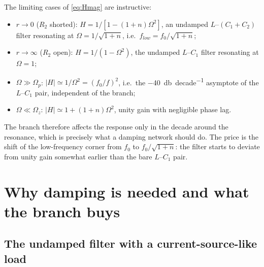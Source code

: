 \documentclass[11pt,a4paper]{article}
\begin{document}
The limiting cases of \eqref{eq:Hmag} are instructive:
\begin{itemize}[nosep]
\item $r \to 0$ ($R_2$ shorted): $H = 1/[1 - (1+n)\Omega^2]$, an undamped $L$--$(C_1+C_2)$
      filter resonating at $\Omega = 1/\sqrt{1+n}$, i.e.\ $f_{low} = f_0/\sqrt{1+n}$;
\item $r \to \infty$ ($R_2$ open): $H = 1/(1 - \Omega^2)$, the undamped $L$--$C_1$ filter
      resonating at $\Omega = 1$;
\item $\Omega \gg \Omega_p$: $|H| \simeq 1/\Omega^2 = (f_0/f)^2$, i.e.\ the
      \SI{-40}{\decibel\per decade} asymptote of the $L$--$C_1$ pair, independent of the
      branch;
\item $\Omega \ll \Omega_z$: $|H| \simeq 1 + (1+n)\Omega^2$, unity gain with negligible
      phase lag.
\end{itemize}
The branch therefore affects the response only in the decade around the resonance,
which is precisely what a damping network should do. The price is the shift of the
low-frequency corner from $f_0$ to $f_0/\sqrt{1+n}$: the filter starts to deviate from
unity gain somewhat earlier than the bare $L$--$C_1$ pair.

\section{Why damping is needed and what the branch buys}
\label{sec:benefit}

\subsection{The undamped filter with a current-source-like load}
\end{document}
